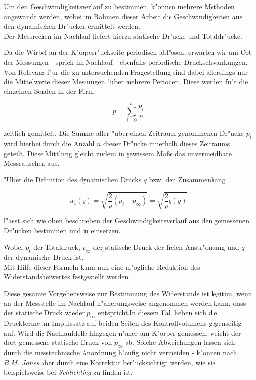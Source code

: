 Um den Geschwindigkeitsverlauf zu bestimmen, k"onnen mehrere Methoden angewandt werden, wobei im Rahmen dieser Arbeit die Geschwindigkeiten aus den dynamischen Dr"ucken ermittelt werden.\\
Der Messrechen im Nachlauf liefert hierzu statische Dr"ucke und Totaldr"ucke.

Da die Wirbel an der K"orperr"uckseite periodisch abl"osen, erwarten wir am Ort der Messungen - sprich im Nachlauf - ebenfalls periodische Druckschwankungen.
Von Relevanz f"ur die zu untersuchenden Fragestellung sind dabei allerdings nur die Mittelwerte dieser Messungen "uber mehrere Perioden.
Diese werden fu"r die einzelnen Sonden in der Form
\begin{center}	
	\begin{equation}
		\overline{p}=\sum_{i=0}^{n}\frac{p_i}{n}
	\end{equation}
\end{center}
zeitlich gemittelt.
Die Summe aller "uber einen Zeitraum genommenen Dr"ucke $p_i$ wird hierbei durch die Anzahl $n$ dieser Dr"ucke innerhalb dieses Zeitraums geteilt.
Diese Mittlung gleicht zudem in gewissem Ma\ss{}e das unvermeidbare Messrauschen aus.

"Uber die Definition des dynamischen Drucks $q$ bzw. den Zusammenhang
\begin{center}
	\begin{equation}
		\label{geschwindigkeitsformel}
		u_{1}(y)= \sqrt{\frac{2}{\rho}(p_t - p_{\infty}) } = \sqrt{\frac{2}{\rho} q(y)}
	\end{equation}
\end{center}
l"asst sich wie oben beschrieben der Geschwindigkeitsverlauf aus den gemessenen Dr"ucken bestimmen und in  einsetzen. 

Wobei $p_t$ der Totaldruck, $p_{\infty}$ der statische Druck der freien Anstr"omung und $q$ der dynamische Druck ist.\\
Mit Hilfe dieser Formeln kann nun eine m"ogliche Reduktion des Widerstandsbeiwertes festgestellt werden.

Diese gesamte Vorgehensweise zur Bestimmung des Widerstands ist legitim, wenn an der Messstelle im Nachlauf n"aherungsweise angenommen werden kann, dass der statische Druck wieder $p_\infty$ entspricht.In diesem Fall heben sich die Druckterme im Impulssatz auf  beiden Seiten des Kontrollvolumens gegenseitig auf.
Wird die Nachlaufdelle hingegen n"aher am K"orper gemessen, weicht der dort gemessene statische Druck von $p_{\infty}$ ab.
Solche Abweichungen lassen sich durch die messtechnische Anordnung h"aufig nicht vermeiden - 
k"onnen nach \textit{B.M. Jones} aber durch eine Korrektur ber"ucksichtigt werden, wie sie beispielsweise bei \textit{Schlichting} \cite{Schlichting.2001} zu finden ist.

